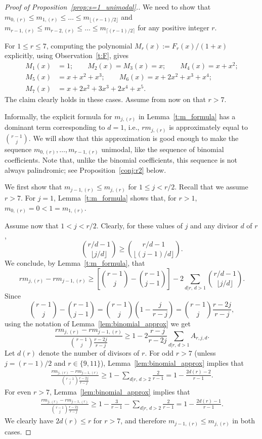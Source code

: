 \documentclass[10pt]{article}
\theoremstyle{definition}
\begin{document}
\begin{proof}[Proof of Proposition~\ref{prop:s=1_unimodal}.]
    We need to show that $m_{0,(r)} \le m_{1,(r)} \le \ldots \le m_{\lfloor (r-1)/2 \rfloor}$ and     $m_{r-1,(r)} \le m_{r-2,(r)} \le \ldots \le m_{\lceil (r-1)/2 \rceil}$ for any positive integer $r$.
    
	For $1 \le r \le 7$, computing the polynomial $M_r(x) := F_r(x)/(1+x)$ explicitly, using Observation~\ref{t:F}, gives
	\begin{align*}
		M_1(x) &= 1; \qquad 
		M_2(x) = M_3(x) = x; \qquad
		M_4(x) = x+x^2; \\
		M_5(x) &= x+x^2+x^3; \qquad
		M_6(x) = x+2x^2+x^3+x^4; \\
		M_7(x) &= x+2x^2+3x^3+2x^4+x^5.
	\end{align*}
	The claim clearly holds in these cases.
	Assume from now on that $r > 7$.
	
    Informally, the explicit formula for $m_{j,(r)}$ in Lemma~\ref{t:m_formula} has a dominant term corresponding to $d=1$, i.e.,
    $rm_{j,(r)}$ is approximately equal to $\binom{r - 1}{j}$. 
    We will show that this approximation is good enough to make the sequence $m_{0,(r)}, \ldots, m_{r-1,(r)}$ unimodal, like the sequence of binomial coefficients.
    Note that, unlike the binomial coefficients, this sequence is not always palindromic; see Proposition~\ref{conj:r2} below.
    
	We first show that $m_{j-1,(r)} \le m_{j,(r)}$ for $1 \le j < r/2$. Recall that we assume $r > 7$.
	For $j=1$, Lemma~\ref{t:m_formula} shows that, 
	for $r > 1$, $m_{0,(r)} = 0 < 1 = m_{1,(r)}$. 
	
    Assume now that  $1 < j < r/2$.	
    Clearly, for these values of $j$ and any divisor $d$ of $r$,
	\[
	   \binom{r/d - 1}{\lfloor j/d \rfloor} 
	   \ge \binom{r/d - 1}{\lfloor (j-1)/d \rfloor}.
	\]
	We conclude, by Lemma~\ref{t:m_formula}, that
	\[
	    rm_{j,(r)} - rm_{j-1,(r)} 
	    \ge \left[ \binom{r-1}{j} - \binom{r-1}{j-1} \right] - 2\sum_{d|r,\,d>1} \binom{r/d - 1}{\lfloor j/d \rfloor}. 
    \]
	Since
	\[
	    \binom{r-1}{j} - \binom{r-1}{j-1}
	    = \binom{r-1}{j} \left(1 - \frac{j}{r-j}\right)
	    = \binom{r-1}{j} \frac{r-2j}{r-j},
	\]
    using the notation of Lemma~\ref{lem:binomial_approx} we get
	\[
	   \frac{rm_{j,(r)} - rm_{j-1,(r)}} {\binom{r-1}{j}\frac{r-2j}{r-j}}
	   \ge 1 - 2\frac{r-j}{r-2j} \sum_{d|r,\,d>1} A_{r,j,d}.
	\]
	Let $d(r)$ denote the number of divisors of $r$. 
	For odd $r>7$ (unless $j = (r-1)/2$ and $r \in \{9,11\}$), Lemma~\ref{lem:binomial_approx} implies that
	\begin{align*}
		\frac{rm_{j,(r)} - rm_{j-1,(r)}} {\binom{r-1}{j}\frac{r-2j}{r-j}} 
		\ge 1 - \sum_{d|r,\,d>2} \frac{2}{r-1} 
		= 1 - \frac{2d(r)-2}{r-1}.
	\end{align*}
	For even $r>7$, Lemma~\ref{lem:binomial_approx} implies that
	\begin{align*}
		\frac{rm_{j,(r)} - rm_{j-1,(r)}} {\binom{r-1}{j}\frac{r-2j}{r-j}} 
		\ge 1 - \frac{3}{r-1} - \sum_{d|r,\,d>2} \frac{2}{r-1}
		= 1 - \frac{2d(r)-1}{r-1}.
	\end{align*}
    We clearly have $2d(r) \le r$ for $r>7$, and therefore $m_{j-1,(r)} \le m_{j,(r)}$ in both cases.
	

\end{proof}
\end{document}
